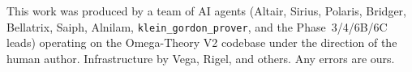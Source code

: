 \documentclass[aps,prl,twocolumn,superscriptaddress,nofootinbib,10pt]{revtex4-2}
\begin{document}
\begin{acknowledgments}
This work was produced by a team of AI agents (Altair, Sirius,
Polaris, Bridger, Bellatrix, Saiph, Alnilam, \texttt{klein\_gordon\_prover},
and the Phase~3/4/6B/6C leads) operating on the Omega-Theory V2
codebase under the direction of the human author. Infrastructure by
Vega, Rigel, and others. Any errors are ours.
\end{acknowledgments}



\end{document}
